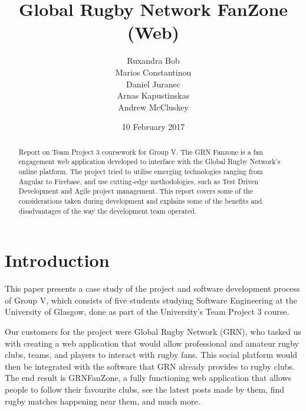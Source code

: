 \documentclass{l3proj}
\begin{document}
\title{Global Rugby Network FanZone (Web)}

\author{Ruxandra Bob \\
		Marios Constantinou \\
        Daniel Juranec \\
        Arnas Kapustinskas \\
        Andrew McCluskey}

\date{10 February 2017}

\maketitle

\begin{abstract}

Report on Team Project 3 coursework for Group V. The GRN Fanzone is a
 fan engagement web application developed to interface with the Global Rugby
 Network's online platform. The project tried to utilise 
 emerging technologies ranging from Angular to Firebase, and use
 cutting-edge methodologies, such as Test Driven Development and Agile
 project management. This report covers some of the considerations taken
 during development and explains some of the benefits and disadvantages
 of the way the development team operated.

\end{abstract}

\educationalconsent

\newpage

\section{Introduction}

This paper presents a case study of the project and software development process of Group V, which consists of five students studying Software Engineering at the University of Glasgow, done as part of the University's Team Project 3 course.

Our customers for the project were Global Rugby Network (GRN), who tasked us with creating a web application that would allow professional and amateur rugby clubs, teams, and players to interact with rugby fans. This social platform would then be integrated with the software that GRN already provides to rugby clubs. The end result is GRNFanZone, a fully functioning web application that allows people to follow their favourite clubs, see the latest posts made by them, find rugby matches happening near them, and much more.
\end{document}
